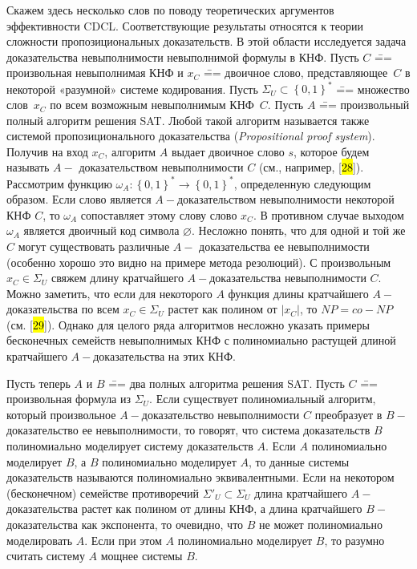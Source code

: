 Скажем здесь несколько слов по поводу теоретических аргументов эффективности CDCL. Соответствующие результаты относятся к теории сложности пропозициональных доказательств. В этой области исследуется задача доказательства невыполнимости невыполнимой формулы в КНФ. Пусть $C$ \=== произвольная невыполнимая КНФ и $x_{C}$ \=== двоичное слово, представляющее~$C$ в некоторой «разумной» системе кодирования. Пусть $\Sigma_{U} \subset \left\{ 0,1 \right\}^{*}$ \=== множество слов~$x_{C}$ по всем возможным невыполнимым КНФ~$C$. Пусть $A$ \=== произвольный полный алгоритм решения SAT. Любой такой алгоритм называется также системой пропозиционального доказательства (\textit{Propositional proof system}). Получив на вход $x_{C}$, алгоритм $A$ выдает двоичное слово $s$, которое будем называть $A -$ доказательством невыполнимости $C$ (см., например, {[}\hl{28}{]}). Рассмотрим функцию $\omega_{A}:\left\{ 0,1 \right\}^{*} \to \left\{ 0,1 \right\}^{*}$, определенную следующим образом. Если слово является $A -$доказательством невыполнимости некоторой КНФ $C$, то $\omega_{A}$ сопоставляет этому слову слово $x_{C}$. В противном случае выходом $\omega_{A}$ является двоичный код символа $\varnothing$. Несложно понять, что для одной и той же $C$ могут существовать различные $A -$ доказательства ее невыполнимости (особенно хорошо это видно на примере метода резолюций). С произвольным $x_{C} \in \Sigma_{U}$ свяжем длину кратчайшего $A -$доказательства невыполнимости $C$. Можно заметить, что если для некоторого $A$ функция длины кратчайшего $A -$доказательства по всем $x_{C} \in \Sigma_{U}$ растет как полином от $|x_{C}|$, то $NP = co - NP$ (см. {[}\hl{29}{]}). Однако для целого ряда алгоритмов несложно указать примеры бесконечных семейств невыполнимых КНФ с полиномиально растущей длиной кратчайшего $A -$доказательства на этих КНФ.

Пусть теперь $A$ и $B$ \=== два полных алгоритма решения SAT. Пусть $C$ \=== произвольная формула из $\Sigma_{U}$. Если существует полиномиальный алгоритм, который произвольное $A -$доказательство невыполнимости $C$ преобразует в $B -$доказательство ее невыполнимости, то говорят, что система доказательств $B$ полиномиально моделирует систему доказательств $A$. Если $A$ полиномиально моделирует $B$, а $B$ полиномиально моделирует $A$, то данные системы доказательств называются полиномиально эквивалентными. Если на некотором (бесконечном) семействе противоречий ${\Sigma'}_{U} \subset \Sigma_{U}$ длина кратчайшего $A -$доказательства растет как полином от длины КНФ, а длина кратчайшего $B -$ доказательства как экспонента, то очевидно, что $B$ не может полиномиально моделировать $A$. Если при этом $A$ полиномиально моделирует $B$, то разумно считать систему $A$ мощнее системы $B$.

